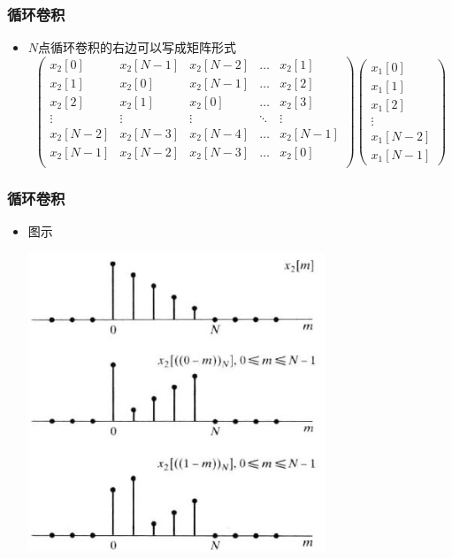 \documentclass[CJKutf8,dvipsnames,table]{beamer}
\begin{document}
\begin{CJK*}{UTF8}{song}
  \begin{frame}
    \frametitle{循环卷积}
    \begin{itemize}
    \item $N$点循环卷积的右边可以写成矩阵形式
	\[
        \begin{pmatrix}
        x_2[0]      & x_2[N-1]   & x_2[N-2]  & \hdots & x_2[1] \\
        x_2[1]      & x_2[0]     & x_2[N-1]  & \hdots & x_2[2] \\
        x_2[2]      & x_2[1]     & x_2[0]    & \hdots & x_2[3] \\
        \vdots & \vdots & \vdots & \ddots & \vdots           \\
        x_2[N-2]    & x_2[N-3]   & x_2[N-4]  & \hdots & x_2[N-1] \\
        x_2[N-1]    & x_2[N-2]   & x_2[N-3]  & \hdots & x_2[0] \\
        \end{pmatrix}	
        \begin{pmatrix}
        x_1[0]  \\
        x_1[1]  \\
        x_1[2]  \\
         \vdots  \\
        x_1[N-2] \\
        x_1[N-1]
        \end{pmatrix}
	\]
		   
	\end{itemize}
  \end{frame}  
        
  \begin{frame}
    \frametitle{循环卷积}
    \begin{itemize}
    \item 图示
   		\begin{center}
   		\includegraphics[scale=.6]{dtsp-c-f8-14acd}
   		\end{center}    
	\end{itemize}
  \end{frame} 


\end{CJK*}
\end{document}
